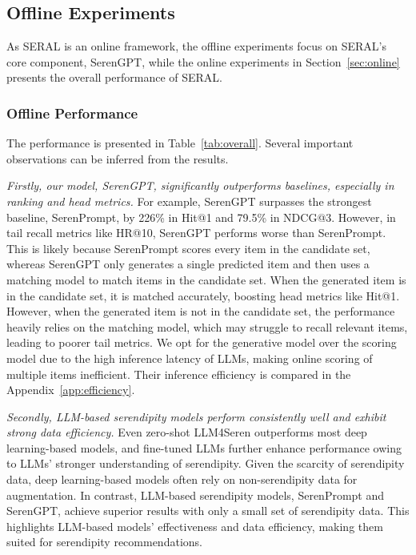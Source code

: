 \vspace{-5pt}
\subsection{Offline Experiments}
As SERAL is an online framework, the offline experiments focus on SERAL's core component, SerenGPT, while the online experiments in Section~\ref{sec:online} presents the overall performance of SERAL.
\subsubsection{Offline Performance}
The performance is presented in Table~\ref{tab:overall}. Several important observations can be inferred from the results. 

\textit{Firstly, our model, SerenGPT, significantly outperforms baselines, especially in ranking and head metrics.} For example, SerenGPT surpasses the strongest baseline, SerenPrompt, by 226\% in Hit@1 and 79.5\% in NDCG@3. However, in tail recall metrics like HR@10, SerenGPT performs worse than SerenPrompt. This is likely because SerenPrompt scores every item in the candidate set, whereas SerenGPT only generates a single predicted item and then uses a matching model to match items in the candidate set. When the generated item is in the candidate set, it is matched accurately, boosting head metrics like Hit@1. However, when the generated item is not in the candidate set, the performance heavily relies on the matching model, which may struggle to recall relevant items, leading to poorer tail metrics. We opt for the generative model over the scoring model due to the high inference latency of LLMs, making online scoring of multiple items inefficient. Their inference efficiency is compared in the Appendix~\ref{app:efficiency}.

\textit{Secondly, LLM-based serendipity models perform consistently well and exhibit strong data efficiency.} Even zero-shot LLM4Seren outperforms most deep learning-based models, and fine-tuned LLMs further enhance performance owing to LLMs' stronger understanding of serendipity. Given the scarcity of serendipity data, deep learning-based models often rely on non-serendipity data for augmentation. In contrast, LLM-based serendipity models, SerenPrompt and SerenGPT, achieve superior results with only a small set of serendipity data. This highlights LLM-based models' effectiveness and data efficiency, making them suited for serendipity recommendations.

